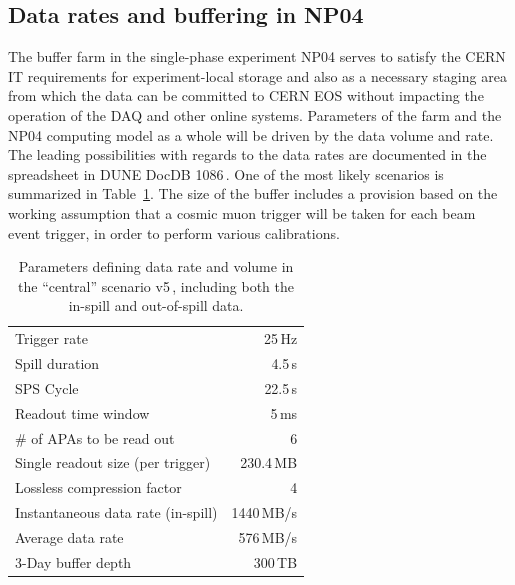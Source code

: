 \documentclass[12pt]{article}
\begin{document}
\noindent


\subsection{Data rates and buffering in NP04}
\label{sec:np04_data_rate}
The buffer farm in the single-phase experiment NP04 serves to satisfy
the CERN IT requirements for experiment-local storage and also as a necessary
staging area from which the data can be committed to CERN EOS without impacting the operation
of the DAQ and other online systems. Parameters of the farm and the NP04 computing model
as a whole will be driven by the data volume and rate. The leading possibilities with regards to the
data rates are documented in the spreadsheet in DUNE DocDB 1086\,\cite{duneDocDb1086}.
One of the most likely scenarios is summarized in Table~\ref{tab:np04_data_rate}. The size of
the buffer includes a provision based on the working assumption that a cosmic muon trigger will
be taken for each beam event trigger, in order to perform various calibrations.

\begin{table}[htbp]
  \centering
  \begin{tabular}[h]{l|r}
\hline
    Trigger rate & 25\,Hz \\
    Spill duration & 4.5\,s\\
    SPS Cycle & 22.5\,s \\
    Readout time window & 5\,ms \\
    \# of APAs to be read out & 6 \\
    \hline
    Single readout size (per trigger) & 230.4\,MB \\
    Lossless compression factor & 4 \\
    Instantaneous data rate (in-spill) & 1440\,MB/s \\
    Average data rate & 576\,MB/s \\
    \hline
    3-Day buffer depth & 300\,TB \\
    \hline
  \end{tabular}
  \caption{Parameters defining data rate and volume in the ``central'' scenario v5\,\cite{duneDocDb1086}, including both
  the in-spill and out-of-spill data.}
  \label{tab:np04_data_rate}
\end{table}

\end{document}
